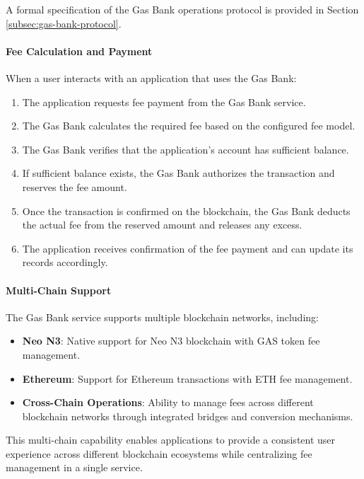 \documentclass{article}
\begin{document}
A formal specification of the Gas Bank operations protocol is provided in Section \ref{subsec:gas-bank-protocol}.



\paragraph{Fee Calculation and Payment}
When a user interacts with an application that uses the Gas Bank:

\begin{enumerate}
    \item The application requests fee payment from the Gas Bank service.
    \item The Gas Bank calculates the required fee based on the configured fee model.
    \item The Gas Bank verifies that the application's account has sufficient balance.
    \item If sufficient balance exists, the Gas Bank authorizes the transaction and reserves the fee amount.
    \item Once the transaction is confirmed on the blockchain, the Gas Bank deducts the actual fee from the reserved amount and releases any excess.
    \item The application receives confirmation of the fee payment and can update its records accordingly.
\end{enumerate}

\paragraph{Multi-Chain Support}
The Gas Bank service supports multiple blockchain networks, including:

\begin{itemize}
    \item \textbf{Neo N3}: Native support for Neo N3 blockchain with GAS token fee management.
    \item \textbf{Ethereum}: Support for Ethereum transactions with ETH fee management.
    \item \textbf{Cross-Chain Operations}: Ability to manage fees across different blockchain networks through integrated bridges and conversion mechanisms.
\end{itemize}

This multi-chain capability enables applications to provide a consistent user experience across different blockchain ecosystems while centralizing fee management in a single service.
\end{document}
